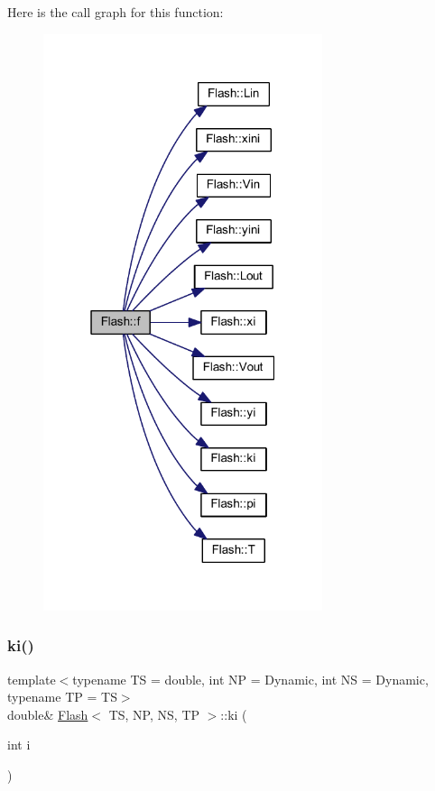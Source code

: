 Here is the call graph for this function\+:\nopagebreak
\begin{figure}[H]
\begin{center}
\leavevmode
\includegraphics[width=232pt]{class_flash_ad29e755877ca96aa5b9f34a10d6cd8b2_cgraph}
\end{center}
\end{figure}
\mbox{\label{class_flash_a5ae7d29d13281fafa84cc9c247461fda}} 
\subsubsection{\texorpdfstring{ki()}{ki()}}
{\footnotesize\ttfamily template$<$typename TS = double, int NP = Dynamic, int NS = Dynamic, typename TP = TS$>$ \\
double\& \mbox{\hyperlink{class_flash}{Flash}}$<$ TS, NP, NS, TP $>$\+::ki (\begin{DoxyParamCaption}\item[{int}]{i }\end{DoxyParamCaption})\hspace{0.3cm}{\ttfamily [inline]}}

